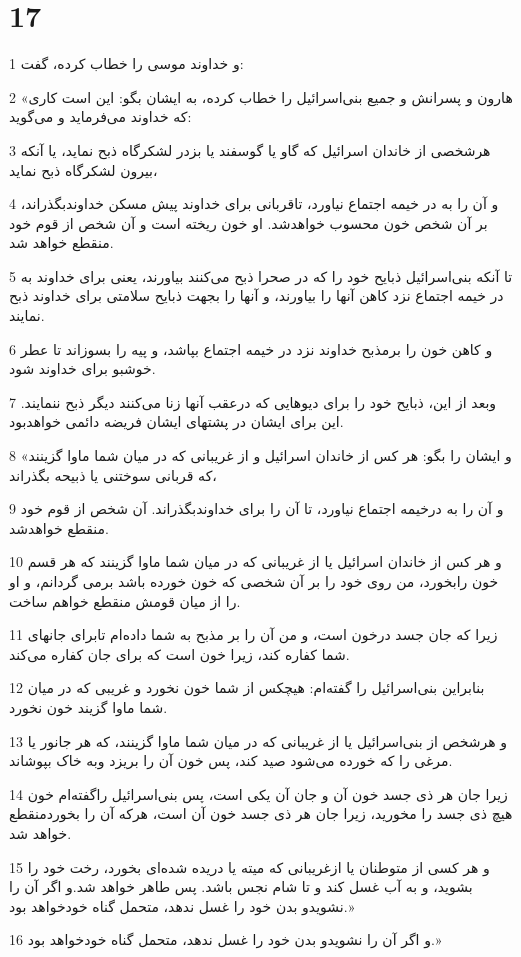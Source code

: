 \chapter{17}

\par 1 و خداوند موسی را خطاب کرده، گفت:
\par 2 «هارون و پسرانش و جمیع بنی‌اسرائیل را خطاب کرده، به ایشان بگو: این است کاری که خداوند می‌فرماید و می‌گوید:
\par 3 هرشخصی از خاندان اسرائیل که گاو یا گوسفند یا بزدر لشکرگاه ذبح نماید، یا آنکه بیرون لشکرگاه ذبح نماید،
\par 4 و آن را به در خیمه اجتماع نیاورد، تاقربانی برای خداوند پیش مسکن خداوندبگذراند، بر آن شخص خون محسوب خواهدشد. او خون ریخته است و آن شخص از قوم خود منقطع خواهد شد.
\par 5 تا آنکه بنی‌اسرائیل ذبایح خود را که در صحرا ذبح می‌کنند بیاورند، یعنی برای خداوند به در خیمه اجتماع نزد کاهن آنها را بیاورند، و آنها را بجهت ذبایح سلامتی برای خداوند ذبح نمایند.
\par 6 و کاهن خون را برمذبح خداوند نزد در خیمه اجتماع بپاشد، و پیه را بسوزاند تا عطر خوشبو برای خداوند شود.
\par 7 وبعد از این، ذبایح خود را برای دیوهایی که درعقب آنها زنا می‌کنند دیگر ذبح ننمایند. این برای ایشان در پشتهای ایشان فریضه دائمی خواهدبود.
\par 8 «و ایشان را بگو: هر کس از خاندان اسرائیل و از غریبانی که در میان شما ماوا گزینند که قربانی سوختنی یا ذبیحه بگذراند،
\par 9 و آن را به درخیمه اجتماع نیاورد، تا آن را برای خداوندبگذراند. آن شخص از قوم خود منقطع خواهدشد.
\par 10 و هر کس از خاندان اسرائیل یا از غریبانی که در میان شما ماوا گزینند که هر قسم خون رابخورد، من روی خود را بر آن شخصی که خون خورده باشد برمی گردانم، و او را از میان قومش منقطع خواهم ساخت.
\par 11 زیرا که جان جسد درخون است، و من آن را بر مذبح به شما داده‌ام تابرای جانهای شما کفاره کند، زیرا خون است که برای جان کفاره می‌کند.
\par 12 بنابراین بنی‌اسرائیل را گفته‌ام: هیچکس از شما خون نخورد و غریبی که در میان شما ماوا گزیند خون نخورد.
\par 13 و هرشخص از بنی‌اسرائیل یا از غریبانی که در میان شما ماوا گزینند، که هر جانور یا مرغی را که خورده می‌شود صید کند، پس خون آن را بریزد وبه خاک بپوشاند.
\par 14 زیرا جان هر ذی جسد خون آن و جان آن یکی است، پس بنی‌اسرائیل راگفته‌ام خون هیچ ذی جسد را مخورید، زیرا جان هر ذی جسد خون آن است، هر‌که آن را بخوردمنقطع خواهد شد.
\par 15 و هر کسی از متوطنان یا ازغریبانی که میته یا دریده شده‌ای بخورد، رخت خود را بشوید، و به آب غسل کند و تا شام نجس باشد. پس طاهر خواهد شد.و اگر آن را نشویدو بدن خود را غسل ندهد، متحمل گناه خودخواهد بود.»
\par 16 و اگر آن را نشویدو بدن خود را غسل ندهد، متحمل گناه خودخواهد بود.»
 
